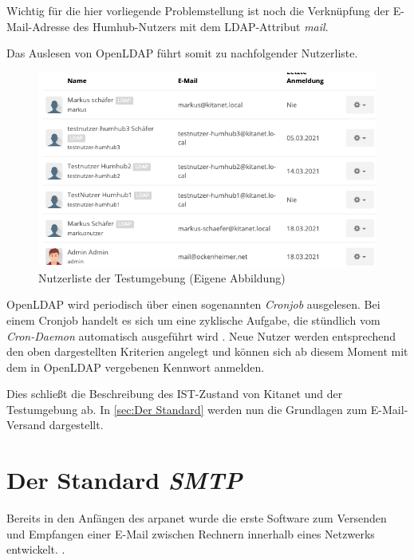 Wichtig für die hier vorliegende Problemstellung ist noch die Verknüpfung der E-Mail-Adresse des Humhub-Nutzers mit dem LDAP-Attribut \textit{mail}. 

Das Auslesen von OpenLDAP führt somit zu nachfolgender Nutzerliste.

\begin{figure}[h]
  \centering
  \includegraphics[width=1.0\textwidth]{res/nutzerliste.png}
  \caption{Nutzerliste der Testumgebung (Eigene Abbildung)}
  \label{fig:Nutzerliste}
\end{figure}

OpenLDAP wird periodisch über einen sogenannten \textit{Cronjob} ausgelesen. Bei einem Cronjob handelt es sich um eine zyklische Aufgabe, die \zb stündlich vom \textit{Cron-Daemon} automatisch ausgeführt wird \citep{cronjob}. Neue Nutzer werden entsprechend den oben dargestellten Kriterien angelegt und können sich ab diesem Moment mit dem in OpenLDAP vergebenen Kennwort anmelden.

Dies schließt die Beschreibung des IST-Zustand von Kitanet und der Testumgebung ab. In \autoref{sec:Der Standard} werden nun die Grundlagen zum E-Mail-Versand dargestellt.

\chapter{Der Standard \textit{SMTP}}
\label{sec:Der Standard}
Bereits in den Anfängen des \ac{arpanet} wurde die erste Software zum Versenden und Empfangen einer E-Mail zwischen Rechnern innerhalb eines Netzwerks entwickelt.  \citep[][]{historyinternet}.

